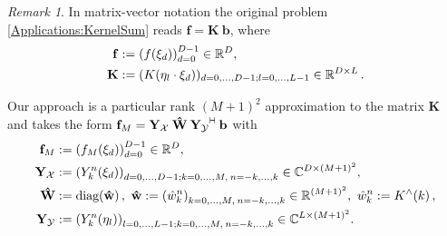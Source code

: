 \documentclass[11pt,a4paper,twoside,bibtotoc]{scrartcl}
\theoremstyle{plain}
\theoremstyle{definition}
\theoremstyle{remark}
\newtheorem{remark}[theorem]{Remark}
\newcommand{\R}{\ensuremath{\mathbb{R}}}
\newcommand{\C}{\ensuremath{\mathbb{C}}}
\newcommand{\adj}{{\vdash \hspace*{-1.72mm} \dashv}}
\newcommand{\fun}[2]{\ensuremath{#1{\hspace{-0.4ex}}\left(#2\right)}}
\newcommand{\diag}{\text{\rm{diag}}}
\numberwithin{equation}{section}
\numberwithin{table}{section}
\numberwithin{figure}{section}
\begin{document}
\begin{remark}\label{rem:rankM}
In matrix-vector notation the original problem \eqref{Applications:KernelSum} reads $\mathbf{f}=\mathbf{K} \: \mathbf{b}$,
where
\begin{align*}
  \mathbf{f} & := \left(\fun{f}{\mathbf{\xi}_{d}}\right)_{d=0}^{D-1} \in \R^D,\\
  \mathbf{K} & :=(\fun{K}{\mathbf{\eta}_{l} \cdot
  \mathbf{\xi}_d})_{d=0,\hdots,D-1;l=0,\hdots,L-1}\in \R^{D\times L}\,.
\end{align*}

Our approach is a particular rank $(M+1)^2$ approximation to the matrix $\mathbf{K}$ and takes the form
$
  \mathbf{f}_M = \mathbf{Y_{\mathcal{X}}} \: \mathbf{\hat W} \:
  \mathbf{Y_{\mathcal{Y}}}^{\adj} \: \mathbf{b}
$
with
\begin{align}
  \nonumber
  \mathbf{f}_M & := \left(\fun{f_M}{\mathbf{\xi}_{d}}\right)_{d=0}^{D-1} \in \R^D,
  \\ \nonumber
  \mathbf{Y_{\mathcal{X}}} & := \left(\fun{Y_k^n}{\mathbf{\xi}_{d}}\right)_{d=0,\ldots,D-1;
  k=0,\ldots,M,\:n=-k,\ldots,k} \in \C^{D \times
  \left(M+1\right)^2}, \\ \nonumber
  \mathbf{\hat W} & := \fun{\diag}{\mathbf{\hat w}},\ \mathbf{\hat w} := \left(\hat
  w_{k}^{n}\right)_{k=0,\ldots,M,\:n=-k,\ldots,k} \in \R^{(M+1)^2},\ \hat w_{k}^n :=
  \fun{K^{\wedge}}{k}, \\ \nonumber
  \mathbf{Y_{\mathcal{Y}}} & := \left(\fun{Y_k^n}{\mathbf{\eta}_{l}}\right)_{l=0,\ldots,L-1;
  k=0,\ldots,M,\:n=-k,\ldots,k} \in \C^{L \times \left(M+1\right)^2}.
\end{align}
\end{remark}
\end{document}
